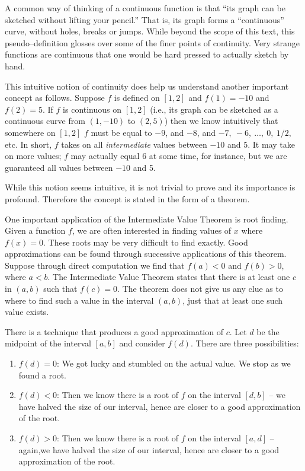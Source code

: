 A common way of thinking of a continuous function is that ``its graph can be sketched without lifting your pencil.'' That is, its graph forms a ``continuous'' curve, without holes, breaks or jumps. 
While beyond the scope of this text, this pseudo--definition glosses over some of the finer points of continuity. Very strange functions are continuous that one would be hard pressed to actually sketch by hand. 

This intuitive notion of continuity does help us understand another important concept as follows. Suppose $f$ is defined on $[1,2]$ and $f(1) = -10$ and $f(2) = 5$. If $f$ is continuous on $[1,2]$ (i.e., its graph can be sketched as a continuous curve from $(1,-10)$ to $(2,5)$) then we know intuitively that somewhere on $[1,2]$ $f$ must be equal to $-9$, and $-8$, and $-7,\ -6,\ \ldots,\ 0,\ 1/2,$ etc. In short, $f$ takes on all \textit{intermediate} values between $-10$ and $5$. It may take on more values; $f$ may actually equal 6 at some time, for instance, but we are guaranteed all values between $-10$ and 5. 

While this notion seems intuitive, it is not trivial to prove and its importance is profound. Therefore the concept is stated in the form of a theorem.


One important application of the Intermediate Value Theorem is root finding. Given a function $f$, we are often interested in finding values of $x$ where $f(x) = 0$. These roots may be very difficult to find exactly. Good approximations can be found through successive applications of this theorem. Suppose through direct computation we find that $f(a) <0 $ and $f(b)>0$, where $a<b$. The Intermediate Value Theorem states that there is at least one $c$ in $(a,b)$ such that $f(c) = 0$. The theorem does not give us any clue as to where to find such a value in the interval $(a,b)$, just that at least one such value exists. 

There is a technique that produces a good approximation of $c$. Let $d$ be the midpoint of the interval $[a,b]$ and consider $f(d)$. There are three possibilities:
	\begin{enumerate} 
	\item		$f(d) = 0$: We got lucky and stumbled on the actual value. We stop as we found a root.
	\item		$f(d) <0$: Then we know there is a root of $f$ on the interval $[d,b]$ -- we have halved the size of our interval, hence are closer to a good approximation of the root.
	\item		$f(d) >0$: Then we know there is a root of $f$ on the interval $[a,d]$ -- again,we have halved the size of our interval, hence are closer to a good approximation of the root.
	\end{enumerate}

